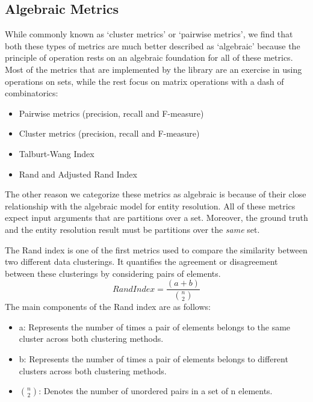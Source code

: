 \documentclass[11pt]{article}
\begin{document}
    \subsection{Algebraic Metrics}
    While commonly known as `cluster metrics'\cite{rand1971,hitesh2012} or
    `pairwise metrics'\cite{hitesh2012,Men10}, we find that both these types of
    metrics are much better described as `algebraic' because the principle of
    operation rests on an algebraic foundation for all of these metrics.
    Most of the metrics that are implemented by the library are an exercise in
    using operations on sets, while the rest focus on matrix operations with a
    dash of combinatorics:
    \begin{itemize}
        \item Pairwise metrics (precision, recall and F-measure)\cite{Men10,hitesh2012}
        \item Cluster metrics (precision, recall and F-measure)\cite{huang2006efficient,hitesh2012}
        \item Talburt-Wang Index\cite{tal2007algebraic}
        \item Rand\cite{rand1971} and Adjusted Rand Index\cite{adjrand1985}
    \end{itemize}

    The other reason we categorize these metrics as algebraic is because of
    their close relationship with the algebraic model for entity resolution.
    All of these metrics expect input arguments that are partitions over a set.
    Moreover, the ground truth and the entity resolution result must be
    partitions over the \textit{same} set.
    
    The Rand index is one of the first metrics used to compare the similarity
    between two different data clusterings.
    It quantifies the agreement or disagreement between these clusterings by
    considering pairs of elements.
        \[Rand Index = \frac{(a + b)}{{n \choose 2}}\]
    The main components of the Rand index are as follows:
    \begin{itemize}
    \item a: Represents the number of times a pair of elements belongs to the
        same cluster across both clustering methods.
    \item b: Represents the number of times a pair of elements belongs to
        different clusters across both clustering methods.
    \item $n \choose 2$: Denotes the number of unordered pairs in a set of n
        elements.
    \end{itemize}
    
\end{document}
